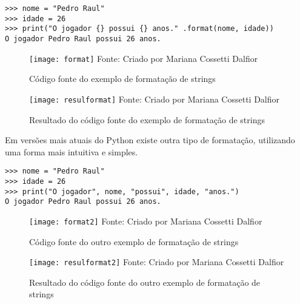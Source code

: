 \begin{itemize}
\begin{lstlisting}
>>> nome = "Pedro Raul"
>>> idade = 26
>>> print("O jogador {} possui {} anos." .format(nome, idade))
O jogador Pedro Raul possui 26 anos.
\end{lstlisting}
	
\begin{figure}[H]
	\begin{center}
		\caption{C\'{o}digo fonte do exemplo de formata\c{c}\~{a}o de strings} \label{fonteformat}
		\texttt{[image: format]} 
		\newline
		Fonte: Criado por Mariana Cossetti Dalfior
	\end{center}
\end{figure}

\begin{figure}[H]
	\begin{center}
		\caption{Resultado do c\'{o}digo fonte do exemplo de formata\c{c}\~{a}o de strings} \label{resulformat}
		\texttt{[image: resulformat]} 
		\newline
		Fonte: Criado por Mariana Cossetti Dalfior
	\end{center}
\end{figure}
	
Em vers\~{o}es mais atuais do Python existe outra tipo de formata\c{c}\~{a}o, utilizando uma forma mais intuitiva e simples. 
		
\begin{lstlisting}
>>> nome = "Pedro Raul"
>>> idade = 26
>>> print("O jogador", nome, "possui", idade, "anos.")
O jogador Pedro Raul possui 26 anos.
\end{lstlisting}

\begin{figure}[H]
	\begin{center}
		\caption{C\'{o}digo fonte do outro exemplo de formata\c{c}\~{a}o de strings} \label{fonteformat2}
		\texttt{[image: format2]} 
		\newline
		Fonte: Criado por Mariana Cossetti Dalfior
	\end{center}
\end{figure}

\begin{figure}[H]
	\begin{center}
		\caption{Resultado do c\'{o}digo fonte do outro exemplo de formata\c{c}\~{a}o de strings} \label{resulformat2}
		\texttt{[image: resulformat2]} 
		\newline
		Fonte: Criado por Mariana Cossetti Dalfior
	\end{center}
\end{figure}
		
    \end{itemize}

